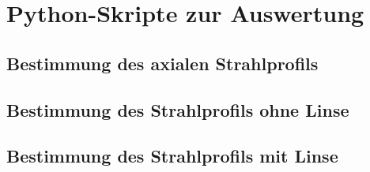 \documentclass[11pt,a4paper,oneside]{scrartcl}
\begin{document}
\section{Python-Skripte zur Auswertung}
\subsection{Bestimmung des axialen Strahlprofils}

\subsection{Bestimmung des Strahlprofils ohne Linse}


\subsection{Bestimmung des Strahlprofils mit Linse}


\end{document}
